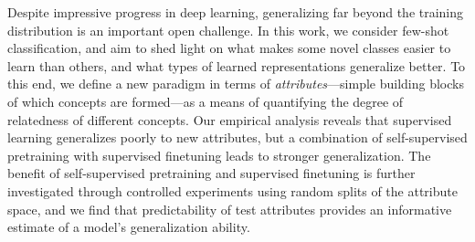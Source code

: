 Despite impressive progress in deep learning, generalizing far beyond the
training distribution is an important open challenge. In this work, we consider
few-shot classification, and aim to shed light on what makes some novel classes
easier to learn than others, and what types of learned representations
generalize better. To this end, we define a new paradigm in terms of
\emph{attributes}---simple building blocks of which concepts are formed---as a
means of quantifying the degree of relatedness of different concepts. Our
empirical analysis reveals that supervised learning generalizes poorly to new
attributes, but a combination of self-supervised pretraining with supervised
finetuning leads to stronger generalization. The benefit of self-supervised
pretraining and supervised finetuning is further investigated through
controlled experiments using random splits of the attribute space, and we find
that predictability of test attributes provides an informative estimate of a
model's generalization ability.